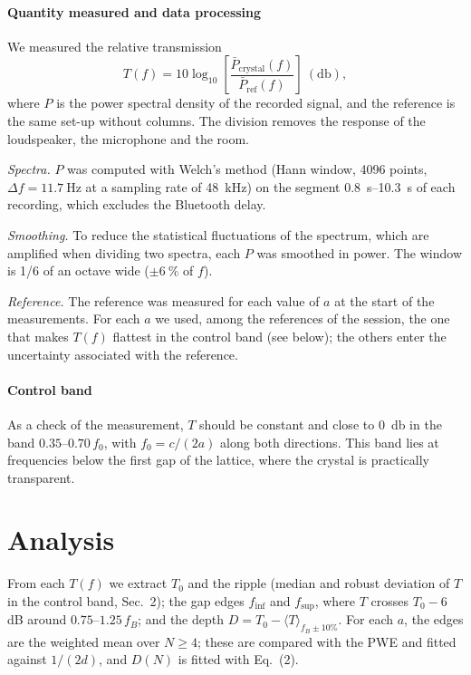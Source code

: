 \documentclass[9pt,a4paper,twocolumn]{extarticle}
\newcommand{\pbreak}{\par\vspace{3pt}}
\newcommand{\finf}{\ensuremath{f_{\mathrm{inf}}}}
\newcommand{\fsup}{\ensuremath{f_{\mathrm{sup}}}}
\begin{document}
\paragraph{Quantity measured and data processing}
We measured the relative transmission
\begin{equation}
  T(f) = 10\log_{10}\!\left[\frac{\bar P_{\mathrm{crystal}}(f)}{\bar P_{\mathrm{ref}}(f)}\right]\ (\si{\decibel}),
\end{equation}
where $P$ is the power spectral density of the recorded signal, and the reference is the same set-up without columns. The division removes the response of the loudspeaker, the microphone and the room.
\pbreak
\emph{Spectra.} $P$ was computed with Welch's method \cite{welch} (Hann window, 4096 points, $\Delta f = \SI{11.7}{\hertz}$ at a sampling rate of \SI{48}{\kilo\hertz}) on the segment \SIrange{0.8}{10.3}{\second} of each recording, which excludes the Bluetooth delay.
\pbreak
\emph{Smoothing.} To reduce the statistical fluctuations of the spectrum, which are amplified when dividing two spectra, each $P$ was smoothed in power. The window is 1/6 of an octave wide ($\pm\SI{6}{\percent}$ of $f$).
\pbreak
\emph{Reference.} The reference was measured for each value of $a$ at the start of the measurements. For each $a$ we used, among the references of the session, the one that makes $T(f)$ flattest in the control band (see below); the others enter the uncertainty associated with the reference.

\paragraph{Control band}
As a check of the measurement, $T$ should be constant and close to \SI{0}{\decibel} in the band $0.35$--$0.70\,f_0$, with $f_0 = c/(2a)$ along both directions. This band lies at frequencies below the first gap of the lattice, where the crystal is practically transparent.

\section{Analysis}
From each $T(f)$ we extract $T_0$ and the ripple (median and robust deviation of $T$ in the control
band, Sec.~2); the gap edges \finf{} and \fsup{}, where $T$ crosses $T_0-6$\,dB around $0.75$--$1.25\,f_B$; and the depth $D=T_0-\langle T\rangle_{f_B\pm10\%}$. For each $a$, the edges
are the weighted mean over $N\ge4$; these are
compared with the PWE and fitted against $1/(2d)$, and $D(N)$ is fitted with Eq.~(2).
\end{document}
